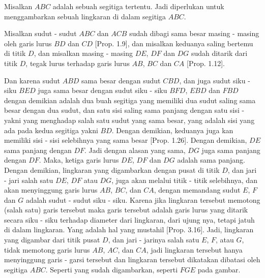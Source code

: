 \documentclass[a4paper]{book}
\begin{document}
\begin{center}
\end{center}

Misalkan $ABC$ adalah sebuah segitiga tertentu. Jadi diperlukan untuk 
menggambarkan sebuah lingkaran di dalam segitiga $ABC$.

Misalkan sudut - sudut $ABC$ dan $ACB$ sudah dibagi sama besar masing -
masing oleh garis lurus $BD$ dan $CD$ [Prop. 1.9], dan misalkan keduanya
saling bertemu di titik $D$, dan misalkan masing - masing $DE$, $DF$ dan 
$DG$ sudah ditarik
dari titik $D$, tegak lurus terhadap garis lurus $AB$, $BC$ dan $CA$
[Prop. 1.12].

Dan karena sudut $ABD$ sama besar dengan sudut $CBD$, dan juga sudut
siku - siku $BED$ juga sama besar dengan sudut siku - siku $BFD$,
$EBD$ dan $FBD$ dengan demikian adalah dua buah segitiga yang memiliki
dua sudut saling sama besar dengan dua sudut, dan satu sisi saling 
sama panjang dengan satu sisi - yakni yang menghadap salah satu sudut 
yang sama besar, yang adalah sisi yang ada pada kedua segitiga yakni
$BD$. Dengan demikian, keduanya juga kan memiliki sisi - sisi selebihnya
yang sama besar [Prop. 1.26]. Dengan demikian, $DE$ sama panjang dengan
$DF$. Jadi dengan alasan yang sama, $DG$  juga sama panjang dengan $DF$. 
Maka, ketiga garis lurus $DE$, $DF$ dan $DG$ adalah sama panjang. Dengan
demikian, lingkaran yang digambarkan dengan pusat di titik $D$, dan
jari - jari salah satu $DE$, $DF$ atau $DG$, juga akan melalui titik - 
titik selebihnya, dan akan menyinggung garis lurus $AB$, $BC$, dan $CA$, 
dengan memandang sudut $E$, $F$ dan $G$ adalah sudut - sudut siku - siku. 
Karena jika lingkaran tersebut memotong (salah satu) garis tersebut 
maka garis tersebut adalah garis 
lurus yang ditarik secara siku - siku terhadap diameter dari lingkaran,
dari ujung nya, tetapi jatuh di dalam lingkaran. Yang adalah hal yang 
mustahil [Prop. 3.16]. Jadi, lingkaran yang digambar dari titik pusat 
$D$, dan jari - jarinya salah satu $E$, $F$, atau $G$, tidak memotong 
garis lurus $AB$, $AC$, dan $CA$, jadi lingkaran tersebut hanya 
menyinggung garis - garsi tersebut dan lingkaran tersebut dikatakan 
dibatasi oleh segitiga $ABC$. Seperti yang sudah digambarkan, seperti
$FGE$ pada gambar.
\end{document}
